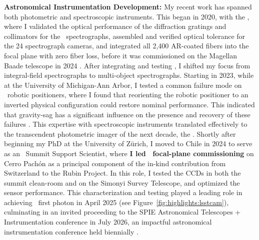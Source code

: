 \textbf{Astronomical Instrumentation Development:}
My recent work has spanned both photometric and spectroscopic instruments.
This began in 2020, with the \LLAMAS, where I validated the optical performance of the diffraction gratings and collimators for the \LLAMAS\ spectrographs, assembled and verified optical tolerance for the 24 spectrograph cameras, and integrated all 2,400 AR-coated fibers into the focal plane with zero fiber loss, before it was commissioned on the Magellan Baade telescope in 2024 \cite{Simcoe2022LLAMAS,llamas}. %
After integrating and testing \LLAMAS, I shifted my focus from integral-field spectrographs to multi-object spectrographs. Starting in 2023, while at the University of Michigan-Ann Arbor, I tested a common failure mode on \DESI\ robotic positioners, where I found that reorienting the robotic positioner to an inverted physical configuration could restore nominal performance. This indicated that gravity-sag has a significant influence on the presence and recovery of these failures \citep{Wuthrich2026Positioners}. %
This expertise with spectroscopic instruments translated effectively to the transcendent photometric imager of the next decade, the \LSSTCam. Shortly after beginning my PhD at the University of Zürich, I moved to Chile in 2024 to serve as an \LSSTCam\ Summit Support Scientist, where \textbf{I led \LSSTCam\ focal-plane commissioning} on Cerro Pach\'on as a principal component of the in-kind contribution from Switzerland to the Rubin Project. In this role, I tested the CCDs in both the summit clean-room and on the Simonyi Survey Telescope, and optimized the sensor performance. This characterization and testing played a leading role in achieving \LSSTCam\ first photon in April 2025 (see Figure~\ref{fig:highlights:lsstcam}), culminating in an invited proceeding to the SPIE Astronomical Telescopes + Instrumentation conference in July 2026, an impactful astronomical instrumentation conference held biennially \citep{MacBride2026LSSTCam}. %
